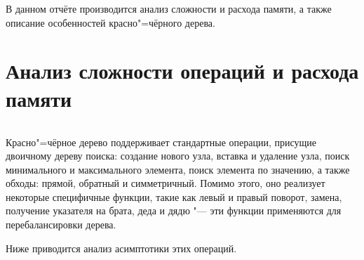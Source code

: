 \documentclass[otchet]{../SCWorks}
\begin{document}

\date{2026}

\maketitle

\secNumbering

\tableofcontents




\intro
В данном отчёте производится анализ сложности и расхода памяти, а также описание особенностей красно"=чёрного дерева.

\section{Анализ сложности операций и расхода памяти}

\small
\inputminted[breaklines]{cpp}{./rb_tree.cpp}
\normalsize

Красно"=чёрное дерево поддерживает стандартные операции, присущие двоичному дереву поиска: создание нового узла, вставка и удаление узла, поиск минимального и максимального элемента, поиск элемента по значению, а также обходы: прямой, обратный и симметричный. Помимо этого, оно реализует некоторые специфичные функции, такие как левый и правый поворот, замена, получение указателя на брата, деда и дядю "--- эти функции применяются для перебалансировки дерева.

Ниже приводится анализ асимптотики этих операций.
\end{document}
